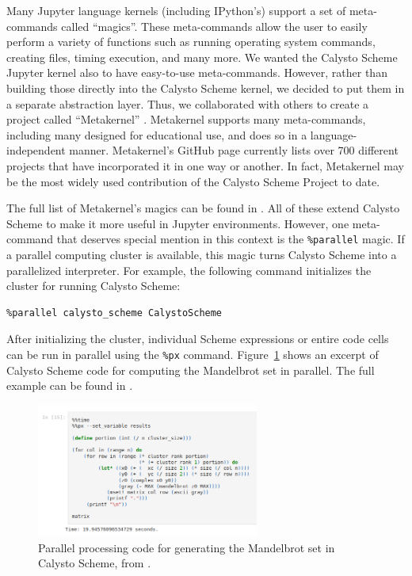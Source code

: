 \documentclass[acmsmall,screen,nonacm]{acmart}
\begin{document}
Many Jupyter language kernels (including IPython's) support a set of
meta-commands called ``magics''. These meta-commands allow the user to easily
perform a variety of functions such as running operating system commands,
creating files, timing execution, and many more. We wanted the Calysto Scheme
Jupyter kernel also to have easy-to-use meta-commands. However, rather than
building those directly into the Calysto Scheme kernel, we decided to put them
in a separate abstraction layer. Thus, we collaborated with others to create a
project called ``Metakernel'' \cite{Metakernel}. Metakernel supports many
meta-commands, including many designed for educational use, and does so in a
language-independent manner. Metakernel's GitHub page currently lists over 700
different projects that have incorporated it in one way or another. In fact,
Metakernel may be the most widely used contribution of the Calysto Scheme
Project to date.

The full list of Metakernel's magics can be found in
\cite{MetakernelMagics}. All of these extend Calysto Scheme to make it more
useful in Jupyter environments. However, one meta-command that deserves special
mention in this context is the \texttt{\%parallel} magic. If a parallel
computing cluster is available, this magic turns Calysto Scheme into a
parallelized interpreter. For example, the following command initializes the
cluster for running Calysto Scheme:

{\small
\begin{verbatim}
%parallel calysto_scheme CalystoScheme
\end{verbatim}
}

After initializing the cluster, individual Scheme expressions or entire code
cells can be run in parallel using the \texttt{\%px}
command. Figure~\ref{fig:parallelized-scheme} shows an excerpt of Calysto
Scheme code for computing the Mandelbrot set in parallel. The full example
can be found in \cite{ParallelProcessingWithMetakernel}.


\begin{figure}[h]
  \centering
  \includegraphics[width=0.65\textwidth]{parallel-scheme.png}
  \caption{Parallel processing code for generating the Mandelbrot set in
    Calysto Scheme, from \cite{ParallelProcessingWithMetakernel}.}
  \label{fig:parallelized-scheme}
\end{figure}
\end{document}
